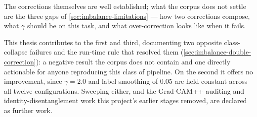 The corrections themselves are well established; what the corpus does not settle are the three gaps of \autoref{sec:imbalance-limitations} --- how two corrections compose, what $\gamma$ should be on this task, and what over-correction looks like when it fails.

This thesis contributes to the first and third, documenting two opposite class-collapse failures and the run-time rule that resolved them (\autoref{sec:imbalance-double-correction}): a negative result the corpus does not contain and one directly actionable for anyone reproducing this class of pipeline. On the second it offers no improvement, since $\gamma = 2.0$ and label smoothing of 0.05 are held constant across all twelve configurations. Sweeping either, and the Grad-CAM++ auditing and identity-disentanglement work this project's earlier stages removed, are declared as further work.
